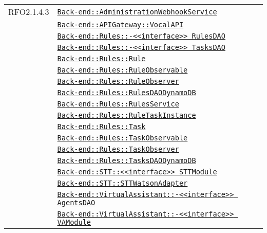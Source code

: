 \begin{longtable}{|>{\centering}m{3cm}|m{10cm}<{\centering}|}
RFO2.1.4.3 & \hyperref[Back-end::AdministrationWebhookService]{\texttt{Back-end::AdministrationWebhookService}}\\
& \hyperref[Back-end::APIGateway::VocalAPI]{\texttt{Back-end::APIGateway::VocalAPI}}\\
& \hyperref[Back-end::Rules::<<interface>> RulesDAO]{\texttt{Back-end::Rules::-\linebreak <<interface>> RulesDAO}}\\
& \hyperref[Back-end::Rules::<<interface>> TasksDAO]{\texttt{Back-end::Rules::-\linebreak <<interface>> TasksDAO}}\\
& \hyperref[Back-end::Rules::Rule]{\texttt{Back-end::Rules::Rule}}\\
& \hyperref[Back-end::Rules::RuleObservable]{\texttt{Back-end::Rules::RuleObservable}}\\
& \hyperref[Back-end::Rules::RuleObserver]{\texttt{Back-end::Rules::RuleObserver}}\\
& \hyperref[Back-end::Rules::RulesDAODynamoDB]{\texttt{Back-end::Rules::RulesDAODynamoDB}}\\
& \hyperref[Back-end::Rules::RulesService]{\texttt{Back-end::Rules::RulesService}}\\
& \hyperref[Back-end::Rules::RuleTaskInstance]{\texttt{Back-end::Rules::RuleTaskInstance}}\\
& \hyperref[Back-end::Rules::Task]{\texttt{Back-end::Rules::Task}}\\
& \hyperref[Back-end::Rules::TaskObservable]{\texttt{Back-end::Rules::TaskObservable}}\\
& \hyperref[Back-end::Rules::TaskObserver]{\texttt{Back-end::Rules::TaskObserver}}\\
& \hyperref[Back-end::Rules::TasksDAODynamoDB]{\texttt{Back-end::Rules::TasksDAODynamoDB}}\\
& \hyperref[Back-end::STT::<<interface>> STTModule]{\texttt{Back-end::STT::<<interface>> STTModule}}\\
& \hyperref[Back-end::STT::STTWatsonAdapter]{\texttt{Back-end::STT::STTWatsonAdapter}}\\
& \hyperref[Back-end::VirtualAssistant::<<interface>> AgentsDAO]{\texttt{Back-end::VirtualAssistant::-\linebreak <<interface>> AgentsDAO}}\\
& \hyperref[Back-end::VirtualAssistant::<<interface>> VAModule]{\texttt{Back-end::VirtualAssistant::-\linebreak <<interface>> VAModule}}\\

\end{longtable}
